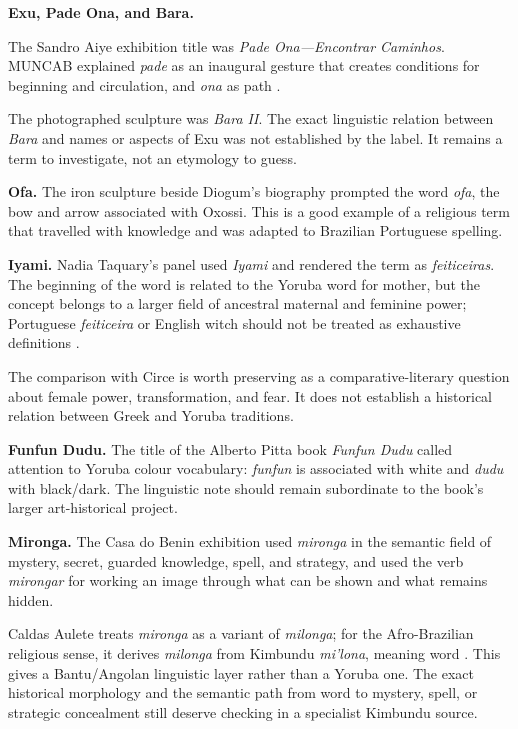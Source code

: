\medskip\noindent
{\bf Exu, Pade Ona, and Bara.}

The Sandro Aiye exhibition title was
\emph{Pade Ona---Encontrar Caminhos}.
MUNCAB explained \emph{pade} as an
inaugural gesture that creates conditions
for beginning and circulation, and
\emph{ona} as path
\cite{muncab2026padeona}.

The photographed sculpture was
\emph{Bara II}.  The exact linguistic
relation between \emph{Bara} and names or
aspects of Exu was not established by the
label.  It remains a term to investigate,
not an etymology to guess.

\medskip\noindent
{\bf Ofa.}
The iron sculpture beside Diogum's biography
prompted the word \emph{ofa},
the bow and arrow associated with Oxossi.
This is a good example of a religious
term that travelled with knowledge and was
adapted to Brazilian Portuguese
spelling.

\medskip\noindent
{\bf Iyami.}
Nadia Taquary's panel used \emph{Iyami} and
rendered the term as
\emph{feiticeiras}. The beginning of the word
is related to the Yoruba word
for mother, but the concept belongs to a
larger field of ancestral maternal
and feminine power; Portuguese
\emph{feiticeira} or English witch should not
be treated as exhaustive definitions
\cite{santos2008iyami}.

The comparison with Circe is worth preserving
as a comparative-literary
question about female power, transformation,
and fear. It does not establish
a historical relation between Greek and
Yoruba traditions.

\medskip\noindent
{\bf Funfun Dudu.}
The title of the Alberto Pitta book
\emph{Funfun Dudu} called attention to
Yoruba colour vocabulary: \emph{funfun} is
associated with white and
\emph{dudu} with black/dark. The linguistic
note should remain subordinate
to the book's larger art-historical project.

\medskip\noindent
{\bf Mironga.}
The Casa do Benin exhibition used
\emph{mironga} in the semantic field of
mystery, secret, guarded knowledge, spell,
and strategy, and used the verb
\emph{mirongar} for working an image through
what can be shown and what
remains hidden.

Caldas Aulete treats \emph{mironga} as a
variant of \emph{milonga}; for the
Afro-Brazilian religious sense, it derives
\emph{milonga} from Kimbundu
\emph{mi'lona}, meaning word
\cite{aulete-milonga}. This gives a
Bantu/Angolan
linguistic layer rather than a Yoruba one.
The exact historical morphology
and the semantic path from word to mystery,
spell, or strategic concealment
still deserve checking in a specialist
Kimbundu source.

